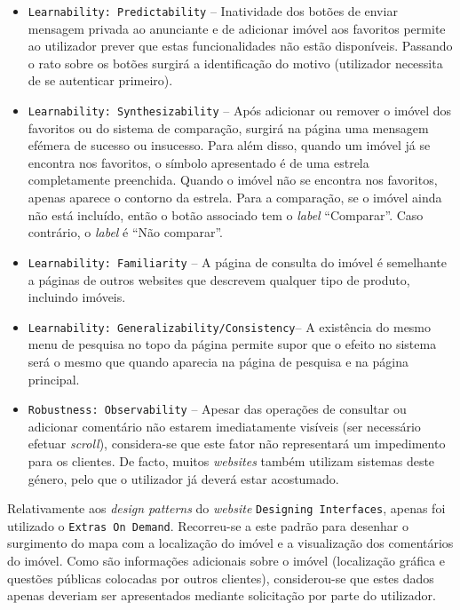 \begin{itemize}
    \item \texttt{Learnability: Predictability} -- Inatividade dos botões de enviar mensagem privada ao anunciante e de adicionar imóvel aos favoritos permite ao utilizador prever que estas funcionalidades não estão disponíveis. Passando o rato sobre os botões surgirá a identificação do motivo (utilizador necessita de se autenticar primeiro).
    
    \item \texttt{Learnability: Synthesizability} -- Após adicionar ou remover o imóvel dos favoritos ou do sistema de comparação, surgirá na página uma mensagem efémera de sucesso ou insucesso. Para além disso, quando um imóvel já se encontra nos favoritos, o símbolo apresentado é de uma estrela completamente preenchida. Quando o imóvel não se encontra nos favoritos, apenas aparece o contorno da estrela. Para a comparação, se o imóvel ainda não está incluído, então o botão associado tem o \textit{label} ``Comparar''. Caso contrário, o \textit{label} é ``Não comparar''.
    
    \item \texttt{Learnability: Familiarity} -- A página de consulta do imóvel é semelhante a páginas de outros websites que descrevem qualquer tipo de produto, incluindo imóveis.
    
    \item \texttt{Learnability: Generalizability/Consistency}-- A existência do mesmo menu de pesquisa no topo da página permite supor que o efeito no sistema será o mesmo que quando aparecia na página de pesquisa e na página principal.
    
    \item \texttt{Robustness: Observability} -- Apesar das operações de consultar ou adicionar comentário não estarem imediatamente visíveis (ser necessário efetuar \textit{scroll}), considera-se que este fator não representará um impedimento para os clientes. De facto, muitos \textit{websites} também utilizam sistemas deste género, pelo que o utilizador já deverá estar acostumado.
\end{itemize}

Relativamente aos \textit{design patterns} do \textit{website} \texttt{Designing Interfaces}, apenas foi utilizado o \texttt{Extras On Demand}. Recorreu-se a este padrão para desenhar o surgimento do mapa com a localização do imóvel e a visualização dos comentários do imóvel. Como são informações adicionais sobre o imóvel (localização gráfica e questões públicas colocadas por outros clientes), considerou-se que estes dados apenas deveriam ser apresentados mediante solicitação por parte do utilizador.

